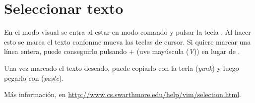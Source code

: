 \section{Seleccionar texto}\label{sec:vim-sel-text}
En el modo visual se entra al estar en modo comando y pulsar la tecla . Al hacer esto se marca el texto
confonme mueva las teclas de cursor. Si quiere marcar una línea entera, puede conseguirlo pulsando
\tecla{\(\Uparrow\)} +  (uve mayúscula (\emph{V})) en lugar de .

Una vez marcado el texto deseado, puede copiarlo con la tecla  (\foreignlanguage{english}{\emph{yank}})
y luego pegarlo con  (\foreignlanguage{english}{\emph{paste}}).

Más información, en \url{http://www.cs.swarthmore.edu/help/vim/selection.html}.
